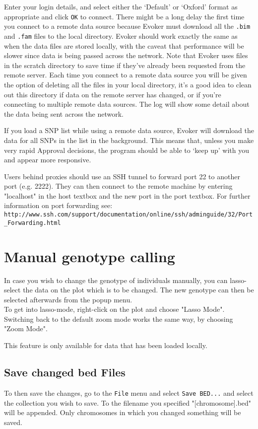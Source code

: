 \documentclass{article}
\begin{document}
Enter your login details, and select either the `Default' or `Oxford' format as appropriate and click \texttt{OK} to connect. There might be a long delay the first time you connect to a remote data source because Evoker must download all the \texttt{.bim} and \texttt{.fam} files to the local directory. Evoker should work exactly the same as when the data files are stored locally, with the caveat that performance will be slower since data is being passed across the network. Note that Evoker uses files in the scratch directory to save time if they've already been requested from the remote server. Each time you connect to a remote data source you will be given the option of deleting all the files in your local directory, it's a good idea to clean out this directory if data on the remote server has changed, or if you're connecting to multiple remote data sources. The log will show some detail about the data being sent across the network.

If you load a SNP list while using a remote data source, Evoker will download the data for all SNPs in the list in the background. This means that, unless you make very rapid Approval decisions, the program should be able to `keep up' with you and appear more responsive.

Users behind proxies should use an SSH tunnel to forward port 22 to another port (e.g. 2222). They can then connect to the remote machine by entering "localhost" in the host textbox and the new port in the port textbox. For further information on port forwarding see:\\\texttt{http://www.ssh.com/support/documentation/online/ssh/adminguide/32/Port\_Forwarding.html}

\section{Manual genotype calling}

In case you wish to change the genotype of individuals manually, you can lasso-select the data on the plot which is to be changed.  The new genotype can then be selected afterwards from the popup menu.\\
To get into lasso-mode, right-click on the plot and choose "Lasso Mode".  Switching back to the default zoom mode works the same way, by choosing "Zoom Mode".

This feature is only available for data that has been loaded locally.

\subsection{Save changed bed Files}
To then save the changes, go to the \texttt{File} menu and select \texttt{Save BED...} and select the collection you wish to save.  To the filename you specified "[chromosome].bed" will be appended.  Only chromosomes in which you changed something will be saved.
\end{document}
